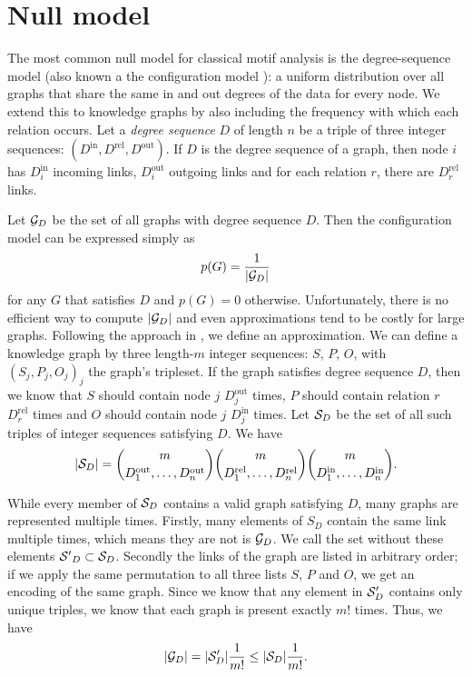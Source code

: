 \documentclass[11pt]{article}
\newcommand{\G}{{\cal G}}
\begin{document}
\section{Null model}

\label{section:null-model}

The most common null model for classical motif analysis is the degree-sequence model (also known a the configuration model \cite{}): a uniform distribution over all graphs that share the same in and out degrees of the data for every node. We extend this to knowledge graphs by also including the frequency with which each relation occurs. Let a \emph{degree sequence} $D$ of length $n$ be a triple of three integer sequences: $(D^\text{in}, D^\text{rel}, D^\text{out})$. If $D$ is the degree sequence of a graph, then node $i$ has $D^\text{in}_i$ incoming links,  $D^\text{out}_i$ outgoing links and for each relation $r$, there are $D^\text{rel}_r$ links.

Let $\G_D$ be the set of all graphs with degree sequence $D$. Then the configuration model can be expressed simply as
\[
p(G) = \frac{1}{|\G_D|}
\]
for any $G$ that satisfies $D$ and $p(G) = 0$ otherwise. Unfortunately, there is no efficient way to compute $|\G_D|$ and even approximations tend to be costly for large graphs. Following the approach in \cite{bloem2017large}, we define an approximation. 
We can define a knowledge graph by three length-$m$ integer sequences: $S$, $P$, $O$, with ${(S_j, P_j, O_j)}_j$ the graph's tripleset. If the graph satisfies degree sequence $D$, then we know that $S$ should contain node $j$ $D^\text{out}_j$ times, $P$ should contain relation $r$ $D^\text{rel}_r$ times and $O$ should contain node $j$ $D^\text{in}_j$ times.  Let ${\cal S}_D$ be the set of all such triples of integer sequences satisfying $D$. We have 
\[
|{\cal S}_D| =
 {m \choose {D_1^\text{out}, \ldots, D_n^\text{out}} }
 {m \choose {D_1^\text{rel}, \ldots, D_n^\text{rel}} }
 {m \choose {D_1^\text{in}, \ldots, D_n^\text{in}} } \text{.}
\]

While every member of ${\cal S}_D$ contains a valid graph satisfying $D$, many graphs are represented multiple times. Firstly, many elements of ${S}_D$ contain the same link multiple times, which means they are not is ${\cal G}_D$. We call the set without these elements ${\cal S'}_D \subset {\cal S}_D$. Secondly the links of the graph are listed in arbitrary order; if we apply the same permutation to all three lists $S$, $P$ and $O$, we get an encoding of the same graph. Since we know that any element in ${\cal S}'_D$ contains only unique triples, we know that each graph is present exactly $m!$ times. Thus, we have
\[
|\G_D| = |{\cal S}'_D| \frac{1}{m!} \leq  |{\cal S}_D| \frac{1}{m!} \text{.}
\]
\end{document}
